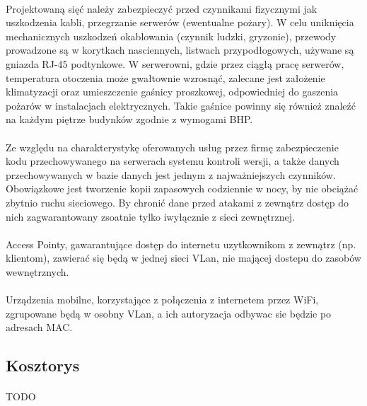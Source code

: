 \paragraph{}
Projektowaną sięć należy zabezpieczyć przed czynnikami fizycznymi jak uszkodzenia kabli, przegrzanie serwerów (ewentualne pożary). W celu uniknięcia mechanicznych uszkodzeń okablowania (czynnik ludzki, gryzonie), przewody prowadzone są w korytkach nasciennych, listwach przypodłogowych, używane są gniazda RJ-45 podtynkowe. W serwerowni, gdzie przez ciągłą pracę serwerów, temperatura otoczenia może gwałtownie wzrosnąć, zalecane jest założenie klimatyzacji oraz umieszczenie gaśnicy proszkowej, odpowiedniej do gaszenia pożarów w instalacjach elektrycznych. Takie gaśnice powinny się również znaleźć na każdym piętrze budynków zgodnie z wymogami BHP.

\paragraph{}
Ze względu na charakterystykę oferowanych usług przez firmę zabezpieczenie kodu przechowywanego na serwerach systemu kontroli wersji, a także danych przechowywanych w bazie danych jest jednym z najważniejszych czynników. Obowiązkowe jest tworzenie kopii zapasowych codziennie w nocy, by nie obciążać zbytnio ruchu sieciowego. By chronić dane przed atakami z zewnątrz dostęp do nich zagwarantowany zsoatnie tylko iwyłącznie z sieci zewnętrznej.

\paragraph{}
Access Pointy, gawarantujące dostęp do internetu uzytkownikom z zewnątrz (np. klientom), zawierać się będą w jednej sieci VLan, nie mającej dostepu do zasobów wewnętrznych.

\paragraph{}
Urządzenia mobilne, korzystające z połączenia z internetem przez WiFi, zgrupowane będą w osobny VLan, a ich autoryzacja odbywac sie będzie po adresach MAC.

\subsection{Kosztorys}
\paragraph{}
TODO